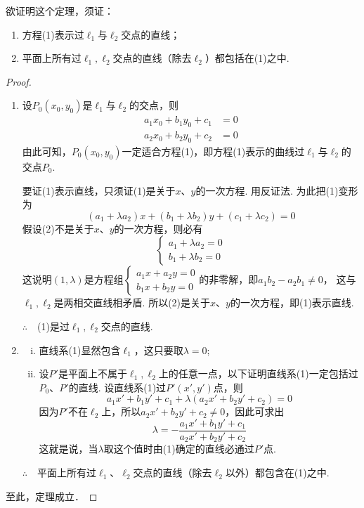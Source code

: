 \begin{analyze}
    欲证明这个定理，须证：
\begin{enumerate}
\item 方程(1)表示过$\ell_1$与$\ell_2$交点的直线；
\item 平面上所有过$\ell_1,\ell_2$交点的直线（除去$\ell_2$）都包括在(1)之中.
\end{enumerate}
\end{analyze}

\begin{proof}
    \begin{enumerate}
        \item 
设$P_0(x_0,y_0)$是$\ell_1$与$\ell_2$的交点，则
\[\begin{split}
  a_1x_0+b_1y_0+c_1&=0\\
a_2x_0+b_2y_0+c_2&=0  
\end{split}\]
由此可知，$P_0(x_0,y_0)$一定适合方程(1)，即方程(1)表示的曲线过$\ell_1$与$\ell_2$的交点$P_0$.

要证(1)表示直线，只须证(1)是关于$x$、$y$的一次方程. 用反证法. 为此把(1)变形为
\begin{equation}
  (a_1+\lambda a_2)x+(b_1+\lambda b_2)y+(c_1+\lambda c_2)=0 \tag{2}  
\end{equation}
假设(2)不是关于$x$、$y$的一次方程，则必有
\[\begin{cases}
    a_1+\lambda a_2=0\\
    b_1+\lambda b_2=0
\end{cases}\]
这说明$(1,\lambda)$是方程组$\begin{cases}
    a_1x+a_2y=0\\ b_1x+b_2y=0
\end{cases}$的非零解，即$a_1b_2-a_2b_1\ne 0$，
这与$\ell_1,\ell_2$是两相交直线相矛盾. 所以(2)是关于$x$、$y$的一次方程，即(1)表示直线.

$\therefore\quad$(1)是过$\ell_1,\ell_2$交点的直线.

\item 
\begin{enumerate}[(i)]
 \item 直线系(1)显然包含$\ell_1$，这只要取$\lambda=0$;
\item 设$P'$是平面上不属于$\ell_1,\ell_2$上的任意一点，以下证明直线系(1)一定包括过$P_0$、$P'$的直线. 设直线系(1)过$P'(x',y')$点，则
\begin{equation}
    a_1x'+b_1y'+c_1+\lambda (a_2x'+b_2y'+c_2)=0 \tag{3}
\end{equation}
因为$P'$不在$\ell_2$上，所以$a_2x'+b_2y'+c_2\ne 0$，因此可求出
\[\lambda=-\frac{a_1x'+b_1y'+c_1}{a_2x'+b_2y'+c_2}\]
这就是说，当$\lambda$取这个值时由(1)确定的直线必通过$P'$点.
\end{enumerate}

$\therefore\quad $平面上所有过$\ell_1$、$\ell_2$交点的直线（除去$\ell_2$以外）都包含在(1)之中.
\end{enumerate}
至此，定理成立．
\end{proof}

